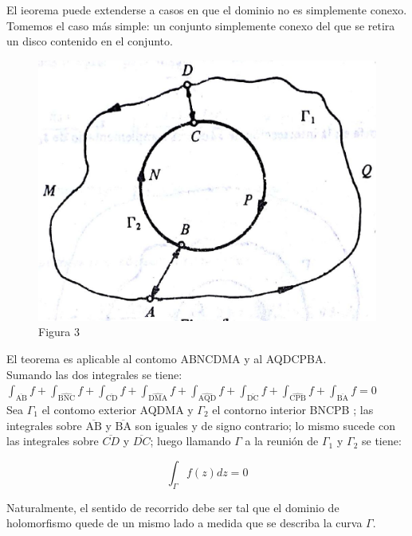 \documentclass[10pt]{article}
\theoremstyle{plain}
\theoremstyle{definition}
\theoremstyle{remark}
\begin{document}
El ieorema puede extenderse a casos en que el dominio no es simplemente conexo. Tomemos el caso más simple: un conjunto simplemente conexo del que se retira un disco contenido en el conjunto.

\begin{figure}[h]
\begin{center}
  \includegraphics[width=\textwidth]{2025_09_05_adecef5eb2053bc129b5g-026}
\captionsetup{labelformat=empty}
\caption{Figura 3}
\end{center}
\end{figure}

El teorema es aplicable al contomo ABNCDMA y al AQDCPBA.\\
Sumando las dos integrales se tiene:\\
$\int_{\overline{\mathrm{AB}}} f+\int_{\widehat{\mathrm{BNC}}} f+\int_{\overline{\mathrm{CD}}} f+\int_{\widehat{\mathrm{DMA}}} f+\int_{\widehat{\mathrm{AQD}}} f+\int_{\overline{\mathrm{DC}}} f+\int_{\widehat{\mathrm{CPB}}} f+\int_{\overline{\mathrm{BA}}} f=0$\\
Sea $\Gamma_{1}$ el contomo exterior AQDMA y $\Gamma_{2}$ el contorno interior BNCPB ; las integrales sobre $\overline{\mathrm{AB}}$ y $\overline{\mathrm{BA}}$ son iguales y de signo contrario; lo mismo sucede con las integrales sobre $\overline{C D}$ y $\overline{D C}$; luego llamando $\Gamma$ a la reunión de $\Gamma_{1}$ y $\Gamma_{2}$ se tiene:

$$
\int_{\Gamma} f(z) d z=0
$$

Naturalmente, el sentido de recorrido debe ser tal que el dominio de holomorfismo quede de un mismo lado a medida que se describa la curva $\Gamma$.
\end{document}
